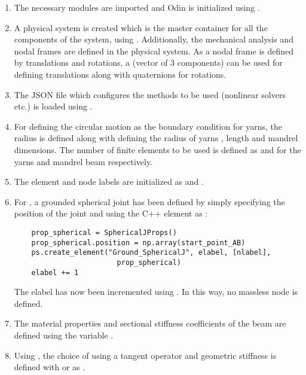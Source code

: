 \begin{enumerate}
    \item The necessary modules are imported and Odin is initialized using .
    \item A physical system is created which is the master container for all the components of the system, using . Additionally, the mechanical analysis and nodal frames are defined in the physical system. As a nodal frame is defined by translations and rotations, a  (vector of 3 components) can be used for defining translations along with quaternions for rotations.
    \item The JSON file which configures the methods to be used (nonlinear solvers etc.) is loaded using .
    \item For defining the circular motion as the boundary condition for yarns, the radius  is defined along with defining the radius of yarns , length  and mandrel dimensions. The number of finite elements to be used is defined as  and  for the yarns and mandrel beam respectively.
    \item The element and node labels are initialized as  and .
    \item For , a grounded spherical joint has been defined by simply specifying the position of the joint and using the C++ element  as :
    \pythonstyle
    \begin{tcolorbox}\begin{lstlisting}
    prop_spherical = SphericalJProps()
    prop_spherical.position = np.array(start_point_AB)
    ps.create_element("Ground_SphericalJ", elabel, [nlabel],
                        prop_spherical)
    elabel += 1 
    \end{lstlisting}\end{tcolorbox}
        The elabel has now been incremented using . In this way, no massless node is defined.
    \item The material properties and sectional stiffness coefficients of the beam are defined using the variable . 
    \item Using , the choice of using a tangent operator and geometric stiffness is defined with  or  as .

\end{enumerate}
